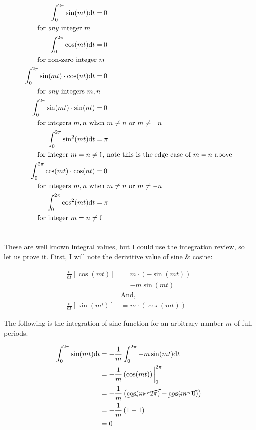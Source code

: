 \documentclass[10pt]{article} %
\begin{document}
\begin{align}
    \int_0^{2\pi} \sin(mt)\mathrm{d}t &= 0 \\
    \intertext{\hspace{0.5cm} for \textit{any} integer $m$}
    \int_0^{2\pi} \cos(mt)\mathrm{d}t &= 0 \\
    \intertext{\hspace{0.5cm} for non-zero integer $m$}
    \int_0^{2\pi} \sin(mt) \cdot \cos(nt)\mathrm{d}t &= 0 \\
    \intertext{\hspace{0.5cm} for \textit{any} integers $m, n$}
    \int_0^{2\pi} \sin(mt) \cdot \sin(nt) &= 0 \\
    \intertext{\hspace{0.5cm} for integers $m,n$ when $m \neq n$ or $m \neq -n$}
    \int_0^{2\pi} \sin^2(mt)\mathrm{d}t &= \pi \\
    \intertext{\hspace{0.5cm} for integer $m = n \neq 0$, note this is the edge case of $m=n$ above}
    \int_0^{2\pi} \cos(mt) \cdot \cos(nt) &= 0 \\
    \intertext{\hspace{0.5cm} for integers $m,n$ when $m \neq n$ or $m \neq -n$}
    \int_0^{2\pi} \cos^2(mt)\mathrm{d}t &= \pi \\
    \intertext{\hspace{0.5cm} for integer $m = n \neq 0$} \notag
\end{align}

These are well known integral values, but I could use the integration review, so let us prove it. First, I will note the derivitive value of sine \& cosine:

\begin{align*}
    \frac{\mathrm{d}}{\mathrm{d}t}[\cos(mt)] & = m\cdot\left(-\sin(mt)\right) \\
    & = -m\sin(mt)\\
    &\text{And,}\\
    \frac{\mathrm{d}}{\mathrm{d}t}[\sin(mt)] & = m\cdot\left(\cos(mt)\right)
\end{align*}

The following is the integration of sine function for an arbitrary number $m$ of full periods.

\begin{align}
    \int_0^{2\pi} \sin(mt)\mathrm{d}t & = -\frac1m\int_0^{2\pi}-m\sin(mt)\mathrm{d}t \\
    & = -\frac1m\left(\cos(mt)\right)\bigg\rvert_0^{2\pi} \\
    & = -\frac1m\left(\cancel{\cos(m\cdot2\pi)} - \cancel{\cos(m\cdot 0)}\right) \\
    & = -\frac1m\left(1 - 1\right) \\
    & = 0
\end{align}
\end{document}
